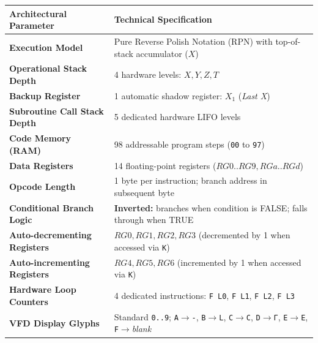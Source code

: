\documentclass[11pt,a4paper]{article}
\begin{document}
\begin{center}
\renewcommand{\arraystretch}{1.2}
\setlength{\tabcolsep}{5pt}
\begin{tabular}{p{5.8cm}p{9.8cm}}
\toprule
\textbf{Architectural Parameter} & \textbf{Technical Specification} \\
\midrule
\textbf{Execution Model} & Pure Reverse Polish Notation (RPN) with top-of-stack accumulator ($X$) \\
\textbf{Operational Stack Depth} & 4 hardware levels: $X, Y, Z, T$ \\
\textbf{Backup Register} & 1 automatic shadow register: $X_1$ (\textit{Last X}) \\
\textbf{Subroutine Call Stack Depth} & 5 dedicated hardware LIFO levels \\
\textbf{Code Memory (RAM)} & 98 addressable program steps (\texttt{00} to \texttt{97}) \\
\textbf{Data Registers} & 14 floating-point registers ($RG0..RG9, RGa..RGd$) \\
\textbf{Opcode Length} & 1 byte per instruction; branch address in subsequent byte \\
\textbf{Conditional Branch Logic} & \textbf{Inverted:} branches when condition is FALSE; falls through when TRUE \\
\textbf{Auto-decrementing Registers} & $RG0, RG1, RG2, RG3$ (decremented by 1 when accessed via \texttt{K}) \\
\textbf{Auto-incrementing Registers} & $RG4, RG5, RG6$ (incremented by 1 when accessed via \texttt{K}) \\
\textbf{Hardware Loop Counters} & 4 dedicated instructions: \texttt{F L0}, \texttt{F L1}, \texttt{F L2}, \texttt{F L3} \\
\textbf{VFD Display Glyphs} & Standard \texttt{0..9}; \texttt{A}$\to$\texttt{-}, \texttt{B}$\to$\texttt{L}, \texttt{C}$\to$\texttt{C}, \texttt{D}$\to$\texttt{Г}, \texttt{E}$\to$\texttt{E}, \texttt{F}$\to$\textit{blank} \\
\bottomrule
\end{tabular}
\end{center}
\end{document}
